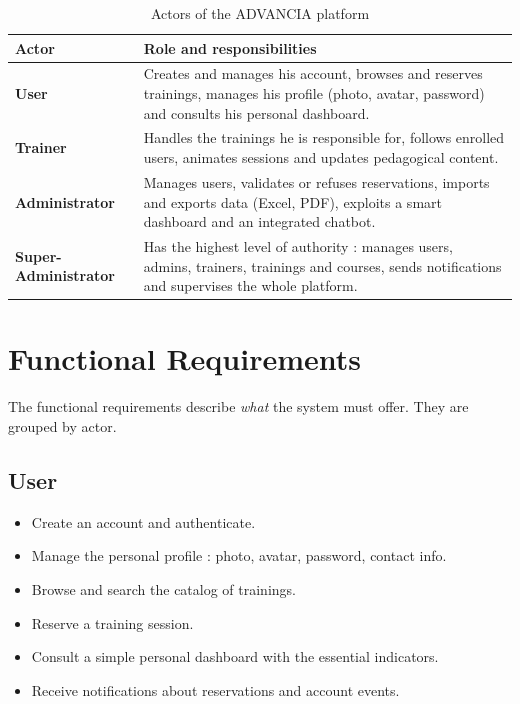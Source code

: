 \begin{table}[H]
\centering
\renewcommand{\arraystretch}{1.35}
\begin{tabularx}{\textwidth}{|>{\columncolor{softblue}}l|X|}
\hline
\rowcolor{primary}
\textbf{\color{white} Actor} & \textbf{\color{white} Role and responsibilities}\\
\hline
\textbf{User} &
Creates and manages his account, browses and reserves trainings, manages his profile (photo, avatar, password) and consults his personal dashboard. \\\hline
\textbf{Trainer} &
Handles the trainings he is responsible for, follows enrolled users, animates sessions and updates pedagogical content. \\\hline
\textbf{Administrator} &
Manages users, validates or refuses reservations, imports and exports data (Excel, PDF), exploits a smart dashboard and an integrated chatbot. \\\hline
\textbf{Super-Administrator} &
Has the highest level of authority : manages users, admins, trainers, trainings and courses, sends notifications and supervises the whole platform. \\\hline
\end{tabularx}
\caption{Actors of the ADVANCIA platform}
\label{tab:actors}
\end{table}

\section{Functional Requirements}

The functional requirements describe \textit{what} the system must offer. They are grouped by actor.

\subsection{User}
\begin{itemize}[leftmargin=2em,itemsep=0.2em]
  \item Create an account and authenticate.
  \item Manage the personal profile : photo, avatar, password, contact info.
  \item Browse and search the catalog of trainings.
  \item Reserve a training session.
  \item Consult a simple personal dashboard with the essential indicators.
  \item Receive notifications about reservations and account events.
\end{itemize}

